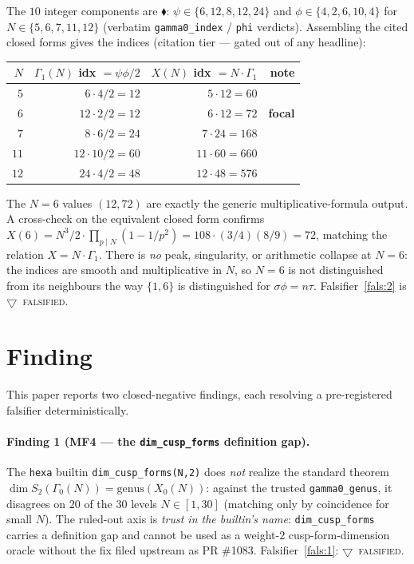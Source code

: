 \documentclass[11pt,a4paper]{article}
\newcommand{\tierF}{\textcolor{blue!60!black}{$\blacklozenge$}}   %
\newcommand{\tierX}{\textcolor{red!70!black}{$\bigtriangledown$}}  %
\newcommand{\sig}{\sigma}
\newcommand{\Gz}{\Gamma_0}
\newcommand{\Go}{\Gamma_1}
\theoremstyle{definition}
\begin{document}
The $10$ integer components are \tierF: $\psi\in\{6,12,8,12,24\}$ and
$\phi\in\{4,2,6,10,4\}$ for $N\in\{5,6,7,11,12\}$ (verbatim
\texttt{gamma0\_index} / \texttt{phi} verdicts). Assembling the cited closed
forms gives the indices (citation tier --- gated out of any headline):
\begin{center}
\begin{tabular}{rrrr}
\toprule
$N$ & $\Go(N)$ idx $=\psi\phi/2$ & $X(N)$ idx $=N\cdot\Go$ & note \\
\midrule
$5$  & $6\cdot4/2=12$  & $5\cdot12=60$   & \\
$6$  & $12\cdot2/2=12$ & $6\cdot12=72$   & \textbf{focal} \\
$7$  & $8\cdot6/2=24$  & $7\cdot24=168$  & \\
$11$ & $12\cdot10/2=60$& $11\cdot60=660$ & \\
$12$ & $24\cdot4/2=48$ & $12\cdot48=576$ & \\
\bottomrule
\end{tabular}
\end{center}
\noindent
The $N=6$ values $(12,72)$ are exactly the generic multiplicative-formula
output. A cross-check on the equivalent closed form confirms $X(6) = N^3/2\cdot
\prod_{p\mid N}(1-1/p^2) = 108\cdot(3/4)(8/9) = 72$, matching the relation
$X = N\cdot\Go$. There is \emph{no} peak, singularity, or arithmetic collapse at
$N=6$: the indices are smooth and multiplicative in $N$, so $N=6$ is not
distinguished from its neighbours the way $\{1,6\}$ is distinguished for
$\sig\phi=n\tau$. Falsifier~\ref{fals:2} is \tierX\ \textsc{falsified}.

\section{Finding}
\label{sec:finding}

This paper reports two closed-negative findings, each resolving a pre-registered
falsifier deterministically.

\paragraph{Finding 1 (MF4 --- the \texttt{dim\_cusp\_forms} definition gap).}
The \texttt{hexa} builtin \texttt{dim\_cusp\_forms(N,2)} does \emph{not} realize
the standard theorem $\dim S_2(\Gz(N))=\mathrm{genus}(X_0(N))$: against the
trusted \texttt{gamma0\_genus}, it disagrees on $20$ of the $30$ levels
$N\in[1,30]$ (matching only by coincidence for small $N$). The ruled-out axis is
\emph{trust in the builtin's name}: \texttt{dim\_cusp\_forms} carries a
definition gap and cannot be used as a weight-$2$ cusp-form-dimension oracle
without the fix filed upstream as PR \#1083. Falsifier~\ref{fals:1}: \tierX\
\textsc{falsified}.
\end{document}
